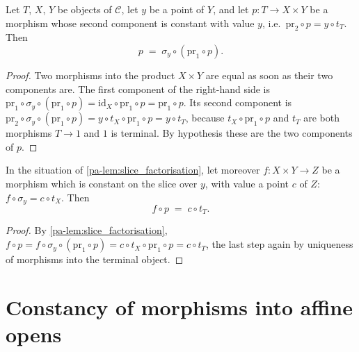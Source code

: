 \begin{lemma}
  \label{pa-lem:slice_factorisation}
  \leanok

  Let \(T\), \(X\), \(Y\) be objects of \(\mathcal C\), let \(y\) be a point of \(Y\), and
  let \(p : T \to X \times Y\) be a morphism whose second component is constant with value
  \(y\), i.e.\ \(\mathrm{pr}_2 \circ p = y \circ t_T\). Then
  \[
    p \;=\; \sigma_y \circ (\mathrm{pr}_1 \circ p).
  \]
\end{lemma}
\begin{proof}
  \leanok
  Two morphisms into the product \(X \times Y\) are equal as soon as their two components
  are. The first component of the right-hand side is
  \(\mathrm{pr}_1 \circ \sigma_y \circ (\mathrm{pr}_1 \circ p)
    = \mathrm{id}_X \circ \mathrm{pr}_1 \circ p = \mathrm{pr}_1 \circ p\). Its second
  component is
  \(\mathrm{pr}_2 \circ \sigma_y \circ (\mathrm{pr}_1 \circ p)
    = y \circ t_X \circ \mathrm{pr}_1 \circ p = y \circ t_T\), because
  \(t_X \circ \mathrm{pr}_1 \circ p\) and \(t_T\) are both morphisms \(T \to 1\) and \(1\) is
  terminal. By hypothesis these are the two components of \(p\).
\end{proof}

\begin{lemma}
  \label{pa-lem:slice_constancy_transfer}
  \leanok

  In the situation of \ref{pa-lem:slice_factorisation}, let moreover \(f : X \times Y \to Z\) be
  a morphism which is constant on the slice over \(y\), with value a point \(c\) of \(Z\):
  \(f \circ \sigma_y = c \circ t_X\). Then
  \[
    f \circ p \;=\; c \circ t_T .
  \]
\end{lemma}
\begin{proof}
  \leanok
  By \ref{pa-lem:slice_factorisation},
  \(f \circ p = f \circ \sigma_y \circ (\mathrm{pr}_1 \circ p)
    = c \circ t_X \circ \mathrm{pr}_1 \circ p = c \circ t_T\),
  the last step again by uniqueness of morphisms into the terminal object.
\end{proof}

\section{Constancy of morphisms into affine opens}

